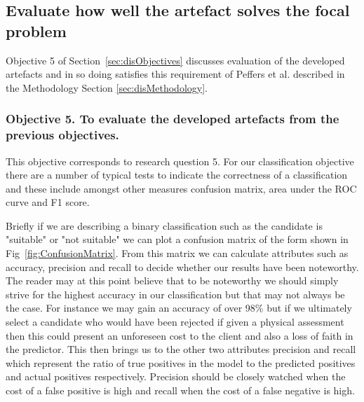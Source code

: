 


\subsection{Evaluate how well the artefact solves the focal problem}

Objective 5 of Section~\ref{sec:disObjectives} discusses evaluation of the developed artefacts and in so doing satisfies
this requirement of Peffers et al. described in the Methodology Section \ref{sec:disMethodology}.

\subsubsection{Objective 5. To evaluate the developed artefacts from the previous objectives.}

This objective corresponds to research question 5. For our classification objective there are a number of typical tests to indicate the correctness of a classification and these include amongst other measures confusion matrix, area under the ROC curve and F1 score.




Briefly if we are describing a binary classification such as the candidate is "suitable" or "not suitable" we can plot a confusion matrix of the form shown in Fig~\ref{fig:ConfusionMatrix}. From this matrix we can calculate attributes such as accuracy, precision and recall to decide whether our results have been noteworthy. The reader may at this point believe that to be noteworthy we should simply strive for the highest accuracy in our classification but that may not always be the case. For instance we may gain an accuracy of over 98\% but if we ultimately select a candidate who would have been rejected if given a physical assessment then this could present an unforeseen cost to the client and also a loss of faith in the predictor. This then brings us to the other two attributes precision and recall which represent the ratio of true positives in the model to the predicted positives and actual positives respectively. Precision should be closely watched when the cost of a false positive is high and recall when the cost of a false negative is high.

